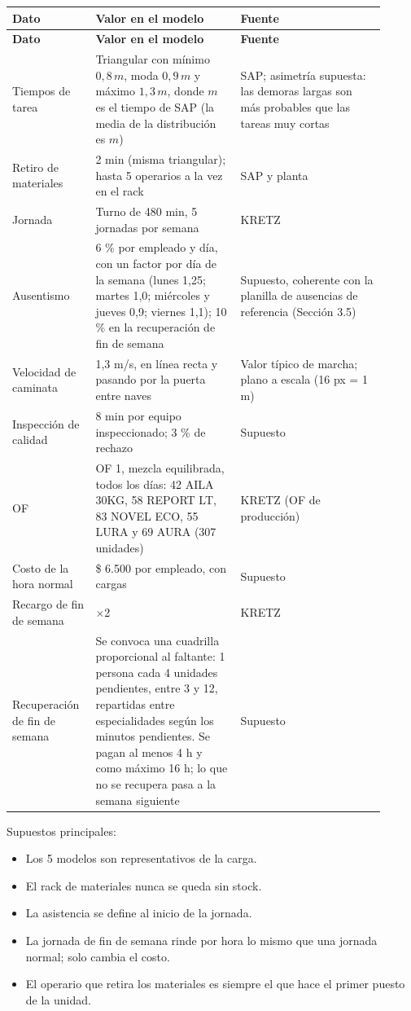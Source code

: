 \documentclass[11pt,a4paper]{article}
\begin{document}
{\small
\begin{longtable}{P{0.177\linewidth}P{0.366\linewidth}P{0.366\linewidth}}
\textbf{Dato} & \textbf{Valor en el modelo} & \textbf{Fuente} \\
\endfirsthead
{}\textbf{Dato} & \textbf{Valor en el modelo} & \textbf{Fuente} \\
\endhead
Tiempos de tarea & Triangular con mínimo $0{,}8\,m$, moda $0{,}9\,m$ y máximo $1{,}3\,m$, donde $m$ es el tiempo de SAP (la media de la distribución es $m$) & SAP; asimetría supuesta: las demoras largas son más probables que las tareas muy cortas \\
Retiro de materiales & 2 min (misma triangular); hasta 5 operarios a la vez en el rack & SAP y planta \\
Jornada & Turno de 480 min, 5 jornadas por semana & KRETZ \\
Ausentismo & 6 \% por empleado y día, con un factor por día de la semana (lunes 1,25; martes 1,0; miércoles y jueves 0,9; viernes 1,1); 10 \% en la recuperación de fin de semana & Supuesto, coherente con la planilla de ausencias de referencia (Sección 3.5) \\
Velocidad de caminata & 1,3 m/s, en línea recta y pasando por la puerta entre naves & Valor típico de marcha; plano a escala (16 px = 1 m) \\
Inspección de calidad & 8 min por equipo inspeccionado; 3 \% de rechazo & Supuesto \\
OF & OF 1, mezcla equilibrada, todos los días: 42 AILA 30KG, 58 REPORT LT, 83 NOVEL ECO, 55 LURA y 69 AURA (307 unidades) & KRETZ (OF de producción) \\
Costo de la hora normal & \$ 6.500 por empleado, con cargas & Supuesto \\
Recargo de fin de semana & $\times$2 & KRETZ \\
Recuperación de fin de semana & Se convoca una cuadrilla proporcional al faltante: 1 persona cada 4 unidades pendientes, entre 3 y 12, repartidas entre especialidades según los minutos pendientes. Se pagan al menos 4 h y como máximo 16 h; lo que no se recupera pasa a la semana siguiente & Supuesto \\
\end{longtable}
}

Supuestos principales:

\begin{itemize}
\item Los 5 modelos son representativos de la carga.
\item El rack de materiales nunca se queda sin stock.
\item La asistencia se define al inicio de la jornada.
\item La jornada de fin de semana rinde por hora lo mismo que una jornada normal; solo cambia el costo.
\item El operario que retira los materiales es siempre el que hace el primer puesto de la unidad.
\end{itemize}
\end{document}
